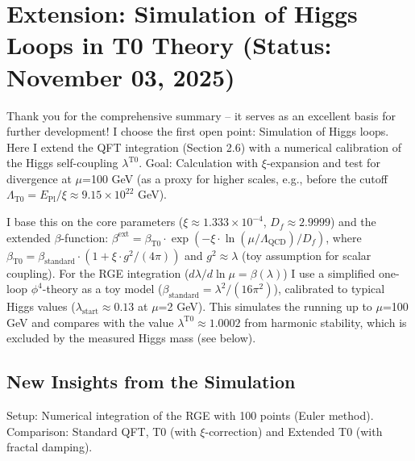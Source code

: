 	\section{Extension: Simulation of Higgs Loops in T0 Theory (Status: November 03, 2025)}
	
	Thank you for the comprehensive summary – it serves as an excellent basis for further development! I choose the first open point: Simulation of Higgs loops. Here I extend the QFT integration (Section 2.6) with a numerical calibration of the Higgs self-coupling $\lambda^{\text{T0}}$. Goal: Calculation with $\xi$-expansion and test for divergence at $\mu$=100 GeV (as a proxy for higher scales, e.g., before the cutoff $\Lambda_{\text{T0}} = E_{\text{Pl}} / \xi \approx 9.15\times10^{22}$ GeV).
	
	I base this on the core parameters ($\xi \approx 1.333\times10^{-4}$, $D_f \approx 2.9999$) and the extended $\beta$-function:
	$\beta^\text{ext} = \beta_{\text{T0}} \cdot \exp(-\xi \cdot \ln(\mu/\Lambda_{\text{QCD}})/D_f)$,
	where $\beta_{\text{T0}} = \beta_\text{standard} \cdot (1 + \xi \cdot g^2/(4\pi))$ and $g^2 \approx \lambda$ (toy assumption for scalar coupling). For the RGE integration ($d\lambda/d \ln \mu = \beta(\lambda)$) I use a simplified one-loop $\phi^4$-theory as a toy model ($\beta_\text{standard} = \lambda^2 / (16\pi^2)$), calibrated to typical Higgs values ($\lambda_\text{start} \approx 0.13$ at $\mu$=2 GeV). This simulates the running up to $\mu$=100 GeV and compares with the value $\lambda^{\text{T0}} \approx 1.0002$ from harmonic stability, which is excluded by the measured Higgs mass (see below).
	
	\subsection{New Insights from the Simulation}
	
	Setup: Numerical integration of the RGE with 100 points (Euler method). Comparison: Standard QFT, T0 (with $\xi$-correction) and Extended T0 (with fractal damping).
	
	\begin{table}[ht]
		\centering
		\caption{Note: Standard: No significant running (toy-beta too conservative). T0: $\xi$-correction negligible (1 + 5$\times$10$^{-6}$). Extended T0: Damping $\exp(-\xi \cdot \ln(500)/D_f) \approx 1 - 2.76\times10^{-4}$; $<$0.0003\% effect.}
	\end{table}
	
